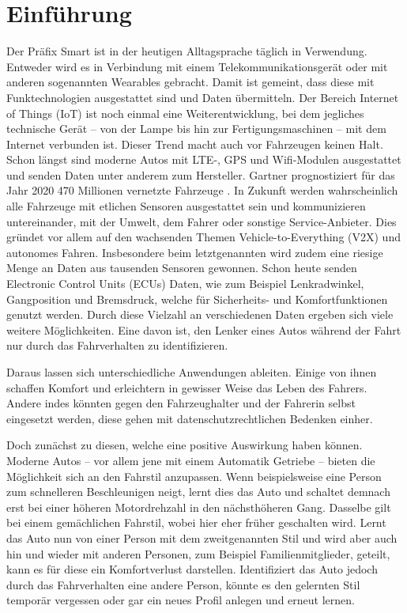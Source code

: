 %
%
%
%
%


\chapter{Einführung}
\label{chap:intro}

Der Präfix Smart ist in der heutigen Alltagsprache täglich in Verwendung. Entweder wird es in Verbindung mit einem Telekommunikationsgerät oder mit anderen sogenannten Wearables gebracht. Damit ist gemeint, dass diese mit Funktechnologien ausgestattet sind und Daten übermitteln. Der Bereich Internet of Things (IoT) ist noch einmal eine Weiterentwicklung, bei dem jegliches technische Gerät – von der Lampe bis hin zur Fertigungsmaschinen – mit dem Internet verbunden ist. Dieser Trend macht auch vor Fahrzeugen keinen Halt. Schon längst sind moderne Autos mit LTE-, GPS und Wifi-Modulen ausgestattet und senden Daten unter anderem zum Hersteller. Gartner prognostiziert für das Jahr 2020 470 Millionen vernetzte Fahrzeuge \cite{gartner2019}. In Zukunft werden wahrscheinlich alle Fahrzeuge mit etlichen Sensoren ausgestattet sein und kommunizieren untereinander, mit der Umwelt, dem Fahrer oder sonstige Service-Anbieter. Dies gründet vor allem auf den wachsenden Themen Vehicle-to-Everything (V2X) und autonomes Fahren. Insbesondere beim letztgenannten wird zudem eine riesige Menge an Daten aus tausenden Sensoren gewonnen. Schon heute senden Electronic Control Units (ECUs) Daten, wie zum Beispiel Lenkradwinkel, Gangposition und Bremsdruck, welche für Sicherheits- und Komfortfunktionen genutzt werden. Durch diese Vielzahl an verschiedenen Daten ergeben sich viele weitere Möglichkeiten. Eine davon ist, den Lenker eines Autos während der Fahrt nur durch das Fahrverhalten zu identifizieren.

Daraus lassen sich unterschiedliche Anwendungen ableiten. Einige von ihnen schaffen Komfort und erleichtern in gewisser Weise das Leben des Fahrers. Andere indes könnten gegen den Fahrzeughalter und der Fahrerin selbst eingesetzt werden, diese gehen mit datenschutzrechtlichen Bedenken einher.

Doch zunächst zu diesen, welche eine positive Auswirkung haben können. Moderne Autos – vor allem jene mit einem Automatik Getriebe – bieten die Möglichkeit sich an den Fahrstil anzupassen. Wenn beispielsweise eine Person zum schnelleren Beschleunigen neigt, lernt dies das Auto und schaltet demnach erst bei einer höheren Motordrehzahl in den nächsthöheren Gang. Dasselbe gilt bei einem gemächlichen Fahrstil, wobei hier eher früher geschalten wird. Lernt das Auto nun von einer Person mit dem zweitgenannten Stil und wird aber auch hin und wieder mit anderen Personen, zum Beispiel Familienmitglieder, geteilt, kann es für diese ein Komfortverlust darstellen. Identifiziert das Auto jedoch durch das Fahrverhalten eine andere Person, könnte es den gelernten Stil temporär vergessen oder gar ein neues Profil anlegen und erneut lernen.

